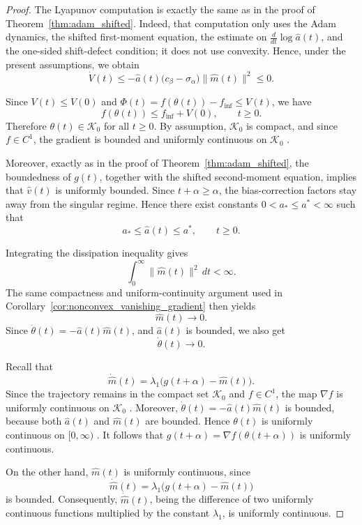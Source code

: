 \documentclass{article} %
\begin{document}
\begin{proof}
The Lyapunov computation is exactly the same as in the proof of Theorem~\ref{thm:adam_shifted}. Indeed, that computation only uses the Adam dynamics, the shifted first-moment equation, the estimate on
\(\frac{d}{dt}\log\widehat a(t)\), and the one-sided shift-defect condition; it does not use convexity. Hence, under the present assumptions, we obtain
\[
    \dot V(t)
    \leq
    -
    \widehat a(t)
    \bigl(c_\beta-\sigma_\alpha\bigr)
    \|\widehat m(t)\|^2
    \leq0.
\]

Since \(V(t)\leq V(0)\) and $\Phi(t)=f(\theta(t))-f_{\inf}\leq V(t)$, we have
\[
    f(\theta(t))\leq f_{\inf}+V(0),
    \qquad t\geq0.
\]
Therefore \(\theta(t)\in\mathcal K_0\) for all \(t\geq0\). By assumption, \(\mathcal K_0\) is compact, and since \(f\in C^1\), the gradient is bounded and uniformly continuous on \(\mathcal K_0\) \cite[Theorem 4.14 and Theorem 4.19]{Rudin1976}.

Moreover, exactly as in the proof of Theorem~\ref{thm:adam_shifted}, the boundedness of \(g(t)\), together with the shifted second-moment equation, implies that \(\widehat v(t)\) is uniformly bounded. Since \(t+\alpha\geq\alpha\),
the bias-correction factors stay away from the singular regime. Hence there exist constants $0<a_*\leq a^*<\infty$ such that
\[
    a_*\leq \widehat a(t)\leq a^*,
    \qquad t\geq0.
\]

Integrating the dissipation inequality gives
\[
    \int_0^\infty \|\widehat m(t)\|^2\,dt<\infty.
\]
The same compactness and uniform-continuity argument used in Corollary~\ref{cor:nonconvex_vanishing_gradient} then yields
\[
    \widehat m(t)\to0.
\]
Since $\dot\theta(t)=-\widehat a(t)\widehat m(t)$, and \(\widehat a(t)\) is bounded, we also get
\[
    \dot\theta(t)\to0.
\]

Recall that
\[
    \dot{\widehat m}(t)
    =
    \lambda_1\bigl(g(t+\alpha)-\widehat m(t)\bigr).
\]
Since the trajectory remains in the compact set \(\mathcal K_0\) and \(f\in C^1\), the map \(\nabla f\) is uniformly continuous on
\(\mathcal K_0\) \cite[Theorem 4.19]{Rudin1976}. Moreover, \(\dot\theta(t)=-\widehat a(t)\widehat m(t)\) is bounded, because both \(\widehat a(t)\) and \(\widehat m(t)\) are bounded. Hence \(\theta(t)\) is uniformly continuous on \([0,\infty)\) \cite[Theorem 5.10]{Rudin1976}. It follows that \(g(t+\alpha)=\nabla f(\theta(t+\alpha))\) is uniformly continuous.

On the other hand, \(\widehat m(t)\) is uniformly continuous, since
\[
    \dot{\widehat m}(t)
    =
    \lambda_1\bigl(g(t+\alpha)-\widehat m(t)\bigr)
\]
is bounded. Consequently, \(\dot{\widehat m}(t)\), being the difference of two uniformly continuous functions multiplied by the constant \(\lambda_1\), is uniformly continuous.


\end{proof}
\end{document}
